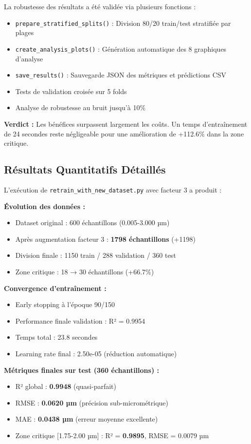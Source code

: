 \documentclass[11pt,a4paper,twocolumn]{article}
\begin{document}
La robustesse des résultats a été validée via plusieurs fonctions :

\begin{itemize}
    \item \texttt{prepare\_stratified\_splits()} : Division 80/20 train/test stratifiée par plages
    \item \texttt{create\_analysis\_plots()} : Génération automatique des 8 graphiques d'analyse
    \item \texttt{save\_results()} : Sauvegarde JSON des métriques et prédictions CSV
    \item Tests de validation croisée sur 5 folds
    \item Analyse de robustesse au bruit jusqu'à 10\%
\end{itemize}

\textbf{Verdict :} Les bénéfices surpassent largement les coûts. Un temps d'entraînement de 24 secondes reste négligeable pour une amélioration de +112.6\% dans la zone critique.



\subsection{Résultats Quantitatifs Détaillés}

L'exécution de \texttt{retrain\_with\_new\_dataset.py} avec facteur 3 a produit :

\textbf{Évolution des données :}
\begin{itemize}
    \item Dataset original : 600 échantillons (0.005-3.000 µm)
    \item Après augmentation facteur 3 : \textbf{1798 échantillons} (+1198)
    \item Division finale : 1150 train / 288 validation / 360 test
    \item Zone critique : 18 → 30 échantillons (+66.7\%)
\end{itemize}

\textbf{Convergence d'entraînement :}
\begin{itemize}
    \item Early stopping à l'époque 90/150
    \item Performance finale validation : R² = 0.9954
    \item Temps total : 23.8 secondes
    \item Learning rate final : 2.50e-05 (réduction automatique)
\end{itemize}

\textbf{Métriques finales sur test (360 échantillons) :}
\begin{itemize}
    \item R² global : \textbf{0.9948} (quasi-parfait)
    \item RMSE : \textbf{0.0620 µm} (précision sub-micrométrique)
    \item MAE : \textbf{0.0438 µm} (erreur moyenne excellente)
    \item Zone critique [1.75-2.00 µm] : R² = \textbf{0.9895}, RMSE = 0.0079 µm
\end{itemize}
\end{document}
